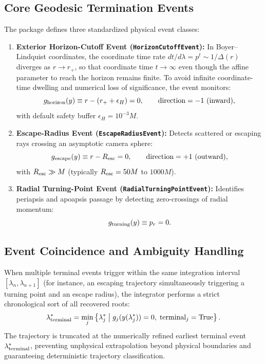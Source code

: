 \subsection{Core Geodesic Termination Events}
The package defines three standardized physical event classes:
\begin{enumerate}
    \item \textbf{Exterior Horizon-Cutoff Event (\texttt{HorizonCutoffEvent}):}  
    In Boyer--Lindquist coordinates, the coordinate time rate $dt/d\lambda = p^t \sim 1/\Delta(r)$ diverges as $r \to r_+$, so that coordinate time $t \to \infty$ even though the affine parameter to reach the horizon remains finite. To avoid infinite coordinate-time dwelling and numerical loss of significance, the event monitors:
    \begin{equation}
        g_{\rm horizon}(y) \equiv r - (r_+ + \epsilon_H) = 0, \qquad \text{direction} = -1 \text{ (inward)},
    \end{equation}
    with default safety buffer $\epsilon_H = 10^{-3}M$.
    \item \textbf{Escape-Radius Event (\texttt{EscapeRadiusEvent}):}  
    Detects scattered or escaping rays crossing an asymptotic camera sphere:
    \begin{equation}
        g_{\rm escape}(y) \equiv r - R_{\rm esc} = 0, \qquad \text{direction} = +1 \text{ (outward)},
    \end{equation}
    with $R_{\rm esc} \gg M$ (typically $R_{\rm esc} = 50M$ to $1000M$).
    \item \textbf{Radial Turning-Point Event (\texttt{RadialTurningPointEvent}):}  
    Identifies periapsis and apoapsis passage by detecting zero-crossings of radial momentum:
    \begin{equation}
        g_{\rm turning}(y) \equiv p_r = 0.
    \end{equation}
\end{enumerate}

\subsection{Event Coincidence and Ambiguity Handling}
When multiple terminal events trigger within the same integration interval $[\lambda_n, \lambda_{n+1}]$ (for instance, an escaping trajectory simultaneously triggering a turning point and an escape radius), the integrator performs a strict chronological sort of all recovered roots:
\begin{equation}
    \lambda^*_{\rm terminal} = \min_{j} \left\{ \lambda^*_j \;\middle|\; g_j(y(\lambda^*_j)) = 0, \; \text{terminal}_j = \text{True} \right\}.
    \label{eq:earliest_root_selection}
\end{equation}
The trajectory is truncated at the numerically refined earliest terminal event $\lambda^*_{\rm terminal}$, preventing unphysical extrapolation beyond physical boundaries and guaranteeing deterministic trajectory classification.
